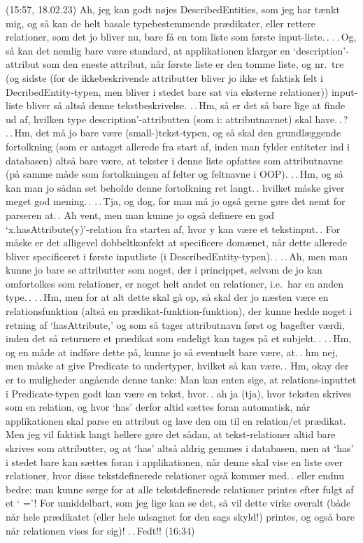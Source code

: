 \documentclass{report}
\begin{document}
(15:57, 18.02.23) Ah, jeg kan godt nøjes DescribedEntities, som jeg har tænkt mig, og så kan de helt basale typebestemmende prædikater, eller rettere relationer, som det jo bliver nu, bare få en tom liste som første input-liste.\,. .\,.\,Og, så kan det nemlig bare være standard, at applikationen klargør en `description'-attribut som den eneste attribut, når første liste er den tomme liste, og nr.\ tre (og sidste (for de ikkebeskrivende attributter bliver jo ikke et faktisk felt i DecribedEntity-typen, men bliver i stedet bare sat via eksterne relationer)) input-liste bliver så altså denne tekstbeskrivelse. .\,.\,Hm, så er det så bare lige at finde ud af, hvilken type description'-attributten (som i: attributnavnet) skal have.\,.\,? .\,.\,Hm, det må jo bare være (small-)tekst-typen, og så skal den grundlæggende fortolkning (som er antaget allerede fra start af, inden man fylder entiteter ind i databasen) altså bare være, at tekster i denne liste opfattes som attributnavne (på samme måde som fortolkningen af felter og feltnavne i OOP). .\,.\,Hm, og så kan man jo sådan set beholde denne fortolkning ret langt.\,. hvilket måske giver meget god mening.\,. .\,.\,Tja, og dog, for man må jo også gerne gøre det nemt for parseren at.\,. Ah vent, men man kunne jo også definere en god `x.hasAttribute(y)'-relation fra starten af, hvor y kan være et tekstinput.\,. For måske er det alligevel dobbeltkonfekt at specificere domænet, når dette allerede bliver specificeret i første inputliste (i DescribedEntity-typen).\,. .\,.\,Ah, men man kunne jo bare se attributter som noget, der i princippet, selvom de jo kan omfortolkes som relationer, er noget helt andet en relationer, i.e.\ har en anden type.\,. .\,.\,Hm, men for at alt dette skal gå op, så skal der jo næsten være en relationsfunktion (altså en prædikat-funktion-funktion), der kunne hedde noget i retning af `hasAttribute,' og som så tager attributnavn først og bagefter værdi, inden det så returnere et prædikat som endeligt kan tages på et subjekt.\,. .\,.\,Hm, og en måde at indføre dette på, kunne jo så eventuelt bare være, at.\,. hm nej, men måske at give Predicate to undertyper, hvilket så kan være.\,. Hm, okay der er to muligheder angående denne tanke: Man kan enten sige, at relations-inputtet i Predicate-typen godt kan være en tekst, hvor.\,. ah ja (tja), hvor teksten skrives som en relation, og hvor `has' derfor altid sættes foran automatisk, når applikationen skal parse en attribut og lave den om til en relation/et prædikat. Men jeg vil faktisk langt hellere gøre det sådan, at tekst-relationer altid bare skrives som attributter, og at `has' altså aldrig gemmes i databasen, men at `has' i stedet bare kan sættes foran i applikationen, når denne skal vise en liste over relationer, hvor disse tekstdefinerede relationer også kommer med.\,. eller endnu bedre: man kunne sørge for at alle tekstdefinerede relationer printes efter fulgt af et ` ='! For umiddelbart, som jeg lige kan se det, så vil dette virke overalt (både når hele prædikatet (eller hele udsagnet for den sags skyld!) printes, og også bare når relationen vises for sig)! .\,.\,Fedt!! (16:34)
\end{document}
